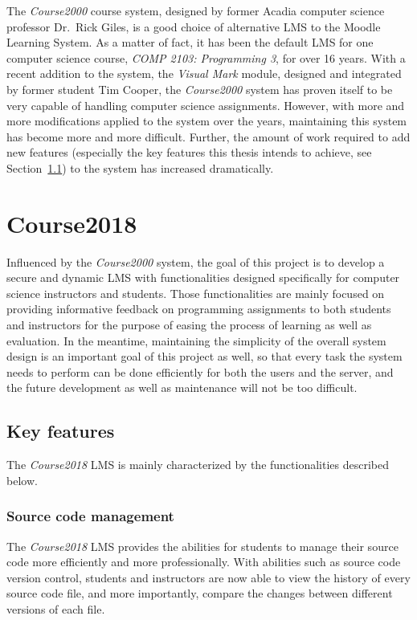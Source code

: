 \medskip

The \emph{Course2000} course system, designed by former Acadia computer science
professor Dr.~Rick Giles, is a good choice
of alternative LMS to the Moodle Learning System.
As a matter of fact, it has been the
default LMS for one computer science course, \emph{COMP 2103: Programming 3},
for over 16 years.
With a recent addition to the system,
the \emph{Visual Mark} module,
designed and integrated by former student Tim Cooper,
the \emph{Course2000} system has proven itself
to be very capable of handling computer science assignments.
However, with more
and more modifications applied to the system over the years, maintaining
this system has become more and more difficult.
Further, the amount of work required to add new features (especially the key
features this thesis intends to achieve, see Section~\ref{FEATURES}) to the system
has increased dramatically.

\section{Course2018}
Influenced by the \emph{Course2000} system, the goal of this project is to
develop a secure and dynamic LMS with functionalities designed specifically for
computer science instructors and students.
Those functionalities are mainly focused on
providing informative feedback on programming assignments to both students
and instructors for the purpose of easing the process of learning as well as
evaluation.
In the meantime, maintaining the simplicity of the overall system design 
is an important goal of this project as well,
so that every task the system needs to
perform can be done efficiently for both the users and the server,
and the future development as well as maintenance will not be too difficult.

\subsection{Key features}
\label{FEATURES}
The \emph{Course2018} LMS is mainly characterized by the functionalities
described below.

\subsubsection{Source code management}
The \emph{Course2018} LMS provides the abilities for students to manage
their source code more efficiently and more professionally. With abilities such
as source code version control, students and instructors are now able
to view the history of every source code file, and more importantly, compare
the changes between different versions of each file.

